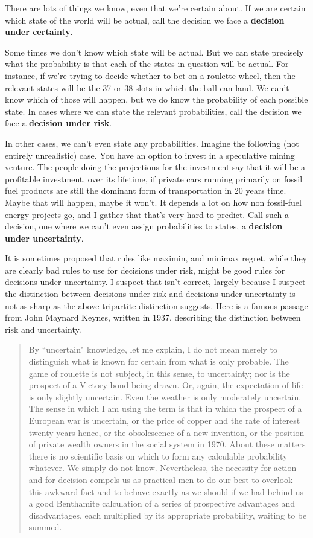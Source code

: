 There are lots of things we know, even that we're certain about. If we are certain which state of the world will be actual, call the decision we face a \textbf{decision under certainty}.

Some times we don't know which state will be actual. But we can state precisely what the probability is that each of the states in question will be actual. For instance, if we're trying to decide whether to bet on a roulette wheel, then the relevant states will be the 37 or 38 slots in which the ball can land. We can't know which of those will happen, but we do know the probability of each possible state. In cases where we can state the relevant probabilities, call the decision we face a \textbf{decision under risk}.

In other cases, we can't even state any probabilities. Imagine the following (not entirely unrealistic) case. You have an option to invest in a speculative mining venture. The people doing the projections for the investment say that it will be a profitable investment, over its lifetime, if private cars running primarily on fossil fuel products are still the dominant form of transportation in 20 years time. Maybe that will happen, maybe it won't. It depends a lot on how non fossil-fuel energy projects go, and I gather that that's very hard to predict. Call such a decision, one where we can't even assign probabilities to states, a \textbf{decision under uncertainty}.

It is sometimes proposed that rules like maximin, and minimax regret, while they are clearly bad rules to use for decisions under risk, might be good rules for decisions under uncertainty. I suspect that isn't correct, largely because I suspect the distinction between decisions under risk and decisions under uncertainty is not as sharp as the above tripartite distinction suggests. Here is a famous passage from John Maynard Keynes, written in 1937, describing the distinction between risk and uncertainty.

\begin{quote}
By ``uncertain" knowledge, let me explain, I do not mean merely to distinguish what is known for certain from what is only probable. The game of roulette is not subject, in this sense, to uncertainty; nor is the prospect of a Victory bond being drawn. Or, again, the expectation of life is only slightly uncertain. Even the weather is only moderately uncertain. The sense in which I am using the term is that in which the prospect of a European war is uncertain, or the price of copper and the rate of interest twenty years hence, or the obsolescence of a new invention, or the position of private wealth owners in the social system in 1970. About these matters there is no scientific basis on which to form any calculable probability whatever. We simply do not know. Nevertheless, the necessity for action and for decision compels us as practical men to do our best to overlook this awkward fact and to behave exactly as we should if we had behind us a good Benthamite calculation of a series of prospective advantages and disadvantages, each multiplied by its appropriate probability, waiting to be summed.
\end{quote}

